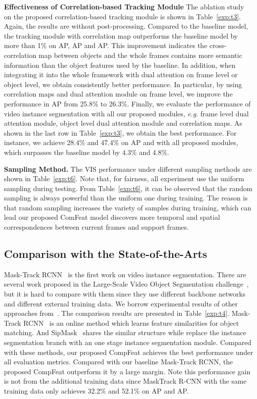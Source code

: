 \documentclass[letterpaper]{article} \usepackage{aaai21}  \usepackage{times}  \usepackage{helvet} \usepackage{courier}  \usepackage[hyphens]{url}  \usepackage{graphicx} \urlstyle{rm} \def\UrlFont{\rm}  \usepackage{natbib}  \usepackage{caption} \frenchspacing  \setlength{\pdfpagewidth}{8.5in}  \setlength{\pdfpageheight}{11in}  \newcommand{\etal}{\emph{et al. }}
\newcommand{\eg}{\emph{e.g. }}
\begin{document}
{\bf Effectiveness of Correlation-based Tracking Module}
The ablation study on the proposed correlation-based tracking module is shown in Table~\ref{exp:t3}. Again, the results are without post-processing. Compared to the baseline model, the tracking module with correlation map outperforms the baseline model by more than 1\% on AP, AP and AP. This improvement indicates the cross-correlation map between objects and the whole frames contains more semantic information than the object features used by the baseline. In addition, when integrating it into the whole framework with dual attention on frame level or object level, we obtain consistently better performance. In particular, by using correlation maps and dual attention module on frame level, we improve the performance in AP from 25.8\% to 26.3\%. Finally, we evaluate the performance of video instance segmentation with all our proposed modules, \eg frame level dual attention module, object level dual attention module and correlation maps. As shown in the last row in Table~\ref{exp:t3}, we obtain the best performance. For instance, we achieve 28.4\% and 47.4\% on AP and  with all proposed modules, which surpasses the baseline model by 4.3\% and 4.8\%. 



{\bf Sampling Method.} The VIS performance under different sampling methods are shown in Table~\ref{exp:t6}. Note that, for fairness, all experiment use the uniform sampling during testing. From Table~\ref{exp:t6}, it can be observed that the random sampling is always powerful than the uniform one during training. The reason is that random sampling increases the variety of samples during training, which can lead our proposed ComFeat model discovers more temporal and spatial correspondences between current frames and support frames.





\subsection{Comparison with the State-of-the-Arts}
Mask-Track RCNN~\cite{yang2019video} is the first work on video instance segmentation. There are several work proposed in the Large-Scale Video Object Segmentation challenge~\cite{luiten2019video,wang2019empirical, dong2019temporal}, but it is hard to compare with them since they use different backbone networks and different external training data. We borrow experimental results of other approaches from~\cite{yang2019video}. The comparison results are presented in Table~\ref{exp:t4}. 
Mask-Track RCNN~\cite{yang2019video} is an online method which learns feature similarities for object matching. And SipMask~\cite{Cao_SipMask_ECCV_2020} shares the similar structure while replace the instance segmentation branch with an one stage instance segmentation module. Compared with these methods, our proposed CompFeat achieves the best performance under all evaluation metrics. Compared with our baseline Mask-Track RCNN, the proposed CompFeat outperform it by a large margin. 
Note this performance gain is not from the additional training data since MaskTrack R-CNN with the same training data only achieves 32.2\% and 52.1\% on AP and AP.
\end{document}

